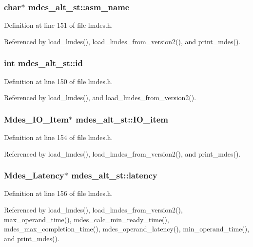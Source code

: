 \subsubsection{\setlength{\rightskip}{0pt plus 5cm}char$\ast$ \bf{mdes\_\-alt\_\-st::asm\_\-name}}\label{structmdes__alt__st_158c1bb56f6965d6b93329e01647d171}




Definition at line 151 of file lmdes.h.

Referenced by load\_\-lmdes(), load\_\-lmdes\_\-from\_\-version2(), and print\_\-mdes().
\subsubsection{\setlength{\rightskip}{0pt plus 5cm}int \bf{mdes\_\-alt\_\-st::id}}\label{structmdes__alt__st_55aae0953d0b100bb5b53e231fde86bd}




Definition at line 150 of file lmdes.h.

Referenced by load\_\-lmdes(), and load\_\-lmdes\_\-from\_\-version2().
\subsubsection{\setlength{\rightskip}{0pt plus 5cm}\bf{Mdes\_\-IO\_\-Item}$\ast$ \bf{mdes\_\-alt\_\-st::IO\_\-item}}\label{structmdes__alt__st_79742a4ca813dce7ad2a421b2b56679a}




Definition at line 154 of file lmdes.h.

Referenced by load\_\-lmdes(), load\_\-lmdes\_\-from\_\-version2(), and print\_\-mdes().
\subsubsection{\setlength{\rightskip}{0pt plus 5cm}\bf{Mdes\_\-Latency}$\ast$ \bf{mdes\_\-alt\_\-st::latency}}\label{structmdes__alt__st_885b2b98fa25f264c2c1bac7fdefb007}




Definition at line 156 of file lmdes.h.

Referenced by load\_\-lmdes(), load\_\-lmdes\_\-from\_\-version2(), max\_\-operand\_\-time(), mdes\_\-calc\_\-min\_\-ready\_\-time(), mdes\_\-max\_\-completion\_\-time(), mdes\_\-operand\_\-latency(), min\_\-operand\_\-time(), and print\_\-mdes().
